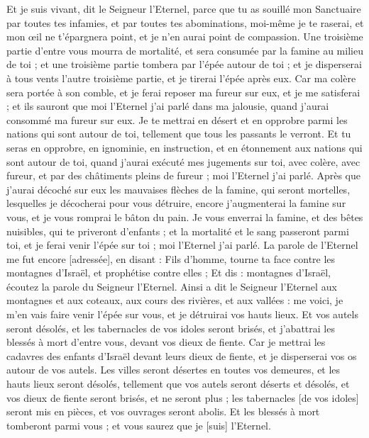 \begin{multicols}{2}
Et je suis vivant, dit le Seigneur l'Eternel, parce que tu as souillé mon Sanctuaire par toutes tes infamies, et par toutes tes abominations, moi-même je te raserai, et mon œil ne t'épargnera point, et je n'en aurai point de compassion.
Une troisième partie d'entre vous mourra de mortalité, et sera consumée par la famine au milieu de toi ; et une troisième partie tombera par l'épée autour de toi ; et je disperserai à tous vents l'autre troisième partie, et je tirerai l'épée après eux.
Car ma colère sera portée à son comble, et je ferai reposer ma fureur sur eux, et je me satisferai ; et ils sauront que moi l'Eternel j'ai parlé dans ma jalousie, quand j'aurai consommé ma fureur sur eux.
Je te mettrai en désert et en opprobre parmi les nations qui sont autour de toi, tellement que tous les passants le verront.
Et tu seras en opprobre, en ignominie, en instruction, et en étonnement aux nations qui sont autour de toi, quand j'aurai exécuté mes jugements sur toi, avec colère, avec fureur, et par des châtiments pleins de fureur ; moi l'Eternel j'ai parlé.
Après que j'aurai décoché sur eux les mauvaises flèches de la famine, qui seront mortelles, lesquelles je décocherai pour vous détruire, encore j'augmenterai la famine sur vous, et je vous romprai le bâton du pain.
Je vous enverrai la famine, et des bêtes nuisibles, qui te priveront d'enfants ; et la mortalité et le sang passeront parmi toi, et je ferai venir l'épée sur toi ; moi l'Eternel j'ai parlé.
\VerseOne{}La parole de l'Eternel me fut encore [adressée], en disant :
Fils d'homme, tourne ta face contre les montagnes d'Israël, et prophétise contre elles ;
Et dis : montagnes d'Israël, écoutez la parole du Seigneur l'Eternel. Ainsi a dit le Seigneur l'Eternel aux montagnes et aux coteaux, aux cours des rivières, et aux vallées : me voici, je m'en vais faire venir l'épée sur vous, et je détruirai vos hauts lieux.
Et vos autels seront désolés, et les tabernacles de vos idoles seront brisés, et j'abattrai les blessés à mort d'entre vous, devant vos dieux de fiente.
Car je mettrai les cadavres des enfants d'Israël devant leurs dieux de fiente, et je disperserai vos os autour de vos autels.
Les villes seront désertes en toutes vos demeures, et les hauts lieux seront désolés, tellement que vos autels seront déserts et désolés, et vos dieux de fiente seront brisés, et ne seront plus ; les tabernacles [de vos idoles] seront mis en pièces, et vos ouvrages seront abolis.
Et les blessés à mort tomberont parmi vous ; et vous saurez que je [suis] l'Eternel.

\end{multicols}
